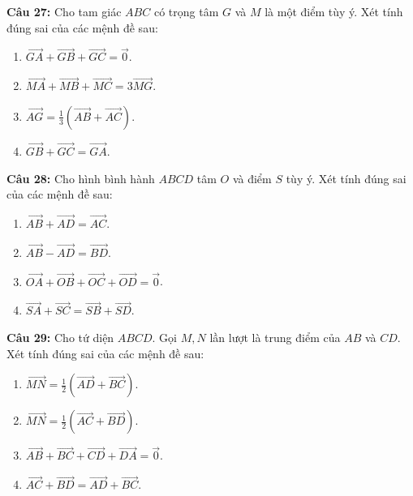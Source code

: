 \documentclass[12pt]{article}
\begin{document}
	\vspace{0.2cm}
	\noindent \textbf{Câu 27:} Cho tam giác $ABC$ có trọng tâm $G$ và $M$ là một điểm tùy ý. Xét tính đúng sai của các mệnh đề sau:
	\begin{enumerate}[label=\alph*)]
		\item $\overrightarrow{GA} + \overrightarrow{GB} + \overrightarrow{GC} = \vec{0}$.
		\item $\overrightarrow{MA} + \overrightarrow{MB} + \overrightarrow{MC} = 3\overrightarrow{MG}$.
		\item $\overrightarrow{AG} = \frac{1}{3}(\overrightarrow{AB} + \overrightarrow{AC})$.
		\item $\overrightarrow{GB} + \overrightarrow{GC} = \overrightarrow{GA}$.
	\end{enumerate}
	
	\vspace{0.2cm}
	\noindent \textbf{Câu 28:} Cho hình bình hành $ABCD$ tâm $O$ và điểm $S$ tùy ý. Xét tính đúng sai của các mệnh đề sau:
	\begin{enumerate}[label=\alph*)]
		\item $\overrightarrow{AB} + \overrightarrow{AD} = \overrightarrow{AC}$.
		\item $\overrightarrow{AB} - \overrightarrow{AD} = \overrightarrow{BD}$.
		\item $\overrightarrow{OA} + \overrightarrow{OB} + \overrightarrow{OC} + \overrightarrow{OD} = \vec{0}$.
		\item $\overrightarrow{SA} + \overrightarrow{SC} = \overrightarrow{SB} + \overrightarrow{SD}$.
	\end{enumerate}
	
	\vspace{0.2cm}
	\noindent \textbf{Câu 29:} Cho tứ diện $ABCD$. Gọi $M, N$ lần lượt là trung điểm của $AB$ và $CD$. Xét tính đúng sai của các mệnh đề sau:
	\begin{enumerate}[label=\alph*)]
		\item $\overrightarrow{MN} = \frac{1}{2}(\overrightarrow{AD} + \overrightarrow{BC})$.
		\item $\overrightarrow{MN} = \frac{1}{2}(\overrightarrow{AC} + \overrightarrow{BD})$.
		\item $\overrightarrow{AB} + \overrightarrow{BC} + \overrightarrow{CD} + \overrightarrow{DA} = \vec{0}$.
		\item $\overrightarrow{AC} + \overrightarrow{BD} = \overrightarrow{AD} + \overrightarrow{BC}$.
	\end{enumerate}
	
\end{document}
